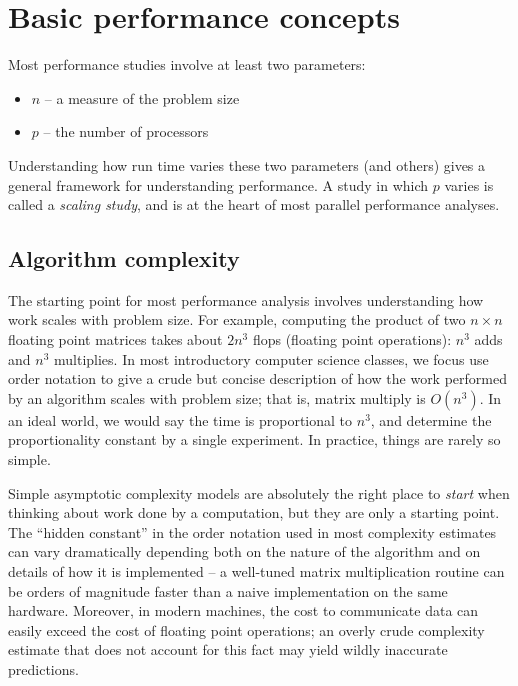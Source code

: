 \documentclass[12pt, leqno]{article} %
\begin{document}
\section{Basic performance concepts}

Most performance studies involve at least two parameters:

\begin{itemize}
\item
  $n$ -- a measure of the problem size
\item
  $p$ -- the number of processors
\end{itemize}

Understanding how run time varies these two parameters (and others)
gives a general framework for understanding performance. A study in
which $p$ varies is called a \emph{scaling study}, and is at the heart
of most parallel performance analyses.

\subsection{Algorithm complexity}

The starting point for most performance analysis involves understanding
how work scales with problem size. For example, computing the product of
two $n \times n$ floating point matrices takes about $2n^3$ flops
(floating point operations): $n^3$ adds and $n^3$ multiplies. In most
introductory computer science classes, we focus use order notation to
give a crude but concise description of how the work performed by an
algorithm scales with problem size; that is, matrix multiply is
$O(n^3)$. In an ideal world, we would say the time is proportional to
$n^3$, and determine the proportionality constant by a single
experiment. In practice, things are rarely so simple.

Simple asymptotic complexity models are absolutely the right place to
\emph{start} when thinking about work done by a computation, but they
are only a starting point. The ``hidden constant'' in the order notation
used in most complexity estimates can vary dramatically depending both
on the nature of the algorithm and on details of how it is implemented
-- a well-tuned matrix multiplication routine can be orders of magnitude
faster than a naive implementation on the same hardware. Moreover, in
modern machines, the cost to communicate data can easily exceed the cost
of floating point operations; an overly crude complexity estimate that
does not account for this fact may yield wildly inaccurate predictions.
\end{document}
